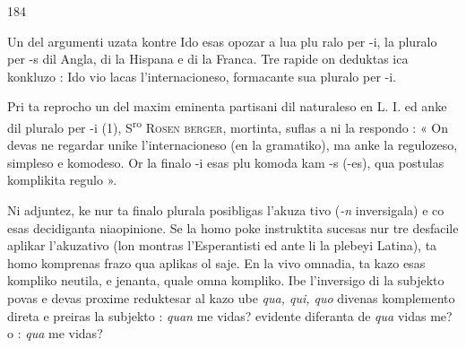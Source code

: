 \begin{VUpage}[188]{184}

Un del argumenti uzata kontre Ido esas opozar a lua plu\cc
ralo per -i, la pluralo per -s dil Angla, di la Hispana e di\nl
la Franca. Tre rapide on deduktas ica konkluzo : Ido vio\cc
lacas l'internacioneso, formacante sua pluralo per -i.

Pri ta reprocho un del maxim eminenta partisani dil\nl
naturaleso en L. I. ed anke dil pluralo per -i (1), S\textsuperscript{ro} \textsc{Rosen}\cc
\textsc{berger}, mortinta, suflas a ni la respondo : « On devas ne\nl
regardar unike l'internacioneso (en la gramatiko), ma anke\nl
la regulozeso, simpleso e komodeso. Or la finalo -i esas plu\nl
komoda kam -s (-es), qua postulas komplikita regulo ».

Ni adjuntez, ke nur ta finalo plurala posibligas l'akuza\cc
tivo (\textit{-n} inversigala) e co esas decidiganta niaopinione. Se\nl
la homo poke instruktita sucesas nur tre desfacile aplikar\nl
l'akuzativo (lon montras l'Esperantisti ed ante li la plebeyi\nl
Latina), ta homo komprenas frazo qua aplikas ol saje. En\nl
la vivo omnadia, ta kazo esas kompliko neutila, e jenanta,\nl
quale omna kompliko. Ibe l'inversigo di la subjekto povas\nl
e devas proxime reduktesar al kazo ube \textit{qua, qui, quo} divenas\nl
komplemento direta e preiras la subjekto : \textit{quan} me vidas?\nl
evidente diferanta de \textit{qua} vidas me? o : \textit{qua} me vidas?


\end{VUpage}
